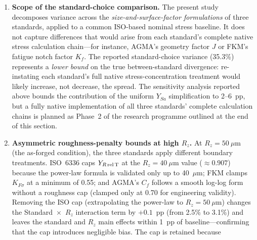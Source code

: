 \documentclass[12pt,a4paper]{article}
\begin{document}
\begin{enumerate}
        I emphasize that the present study does not claim to reproduce
        each standard's complete native workflow. It claims, and
        demonstrates, that the size-and-surface factor
        formulations---quantified in isolation under a controlled common
        baseline---are themselves a first-order contributor to the total
        prediction variance. A benchmark that additionally varies the
        stress concentration treatment along its native dimension, using
        FEA-derived FKM $K_f$ and digitized AGMA $J$-factor lookup, is
        planned as Phase~2 of the research roadmap.%
  \item \textbf{Scope of the standard-choice comparison.} The present study
        decomposes variance across the \emph{size-and-surface-factor
        formulations} of three standards, applied to a common ISO-based
        nominal stress baseline. It does not capture differences that would
        arise from each standard's complete native stress calculation
        chain---for instance, AGMA's geometry factor $J$ or FKM's fatigue
        notch factor $K_f$. The reported standard-choice variance (35.3\%)
        represents a \emph{lower bound} on the true
        between-standard divergence: re-instating each standard's full native
        stress-concentration treatment would likely increase, not decrease,
        the spread. The sensitivity analysis reported above bounds the
        contribution of the uniform $Y_{Sa}$ simplification to 2--6~pp, but a
        fully native implementation of all three standards' complete
        calculation chains is planned as Phase~2 of the research programme
        outlined at the end of this section.
  \item \textbf{Asymmetric roughness-penalty bounds at high $R_z$.} At
        $R_z = 50~\mu$m (the as-forged condition), the three standards
        apply different boundary treatments. ISO~6336 caps
        $Y_{R\,\rm rel\,T}$ at the $R_z = 40~\mu$m value
        ($\approx 0.907$) because the power-law formula is validated only
        up to 40~$\mu$m; FKM clamps $K_{F\sigma}$ at a minimum of 0.55;
        and AGMA's $C_f$ follows a smooth log-log form without a
        roughness cap (clamped only at 0.70 for engineering validity).
        Removing the ISO cap (extrapolating the power-law to
        $R_z=50~\mu$m) changes the Standard~$\times$~$R_z$ interaction
        term by $+0.1$~pp (from 2.5\% to 3.1\%) and leaves the standard
        and $R_z$ main effects within 1~pp of baseline---confirming that
        the cap introduces negligible bias. The cap is retained because

\end{enumerate}
\end{document}
